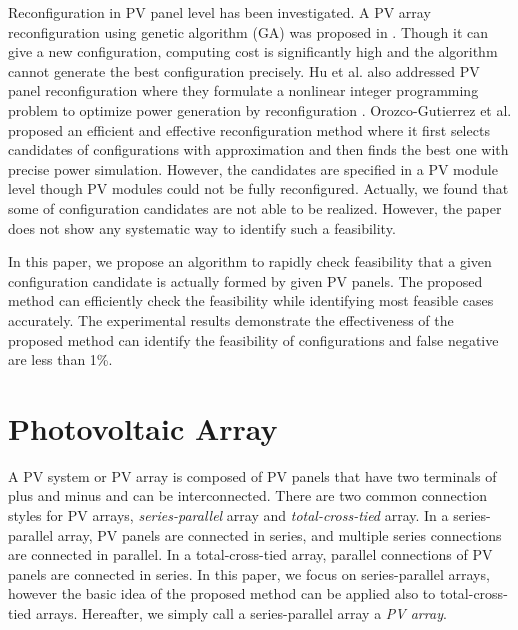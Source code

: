\documentclass[conference]{pvsctran}
\begin{document}
Reconfiguration in PV panel level has been investigated\cite{carotenuto2015evolutionary,hu2017non,orozco2016optimized}. 
A PV array reconfiguration using genetic algorithm (GA) was proposed in \cite{carotenuto2015evolutionary}. Though it can give a new configuration, computing cost is significantly high and the algorithm cannot generate the best configuration precisely.  
Hu et al. also addressed PV panel reconfiguration where they formulate a nonlinear integer programming problem to optimize power generation by reconfiguration \cite{hu2017non}.
Orozco-Gutierrez et al. proposed an efficient and effective reconfiguration method\cite{orozco2016optimized} where it first selects candidates of configurations with approximation and then finds the best one with precise power simulation. 
However, the candidates are specified in a PV module level though PV modules could not be fully reconfigured. Actually, we found that some of configuration candidates are not able to be realized. However, the paper\cite{orozco2016optimized}  does not show any systematic way to identify such a feasibility. 

In this paper, we propose an algorithm to rapidly check feasibility that a given configuration candidate is actually formed by given PV panels. 
The proposed method can efficiently check the feasibility while identifying most feasible cases accurately. 
The experimental results demonstrate the effectiveness of the proposed method can identify the feasibility of configurations and false negative are less than 1\%.





\section{Photovoltaic Array}\label{Sec2}

A PV system or PV array is composed of PV panels that have two terminals of plus and minus and can be interconnected.
There are two common connection styles for PV arrays, \textit{series-parallel} array and \textit{total-cross-tied} array. 
In a series-parallel array, PV panels are connected in series, and multiple series connections are connected in parallel. 
In a total-cross-tied array, parallel connections of PV panels are connected in series. 
In this paper, we focus on series-parallel arrays, however the basic idea of the proposed method can be applied also to total-cross-tied arrays. 
Hereafter, we simply call a series-parallel array a \textit{PV array}. 
\end{document}
